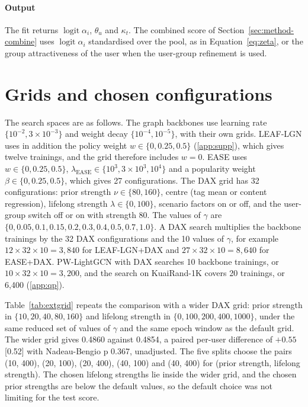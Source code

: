 \documentclass[preprint,12pt,authoryear]{elsarticle}
\begin{document}
\paragraph{Output} The fit returns $\operatorname{logit}\alpha_i$, $\theta_u$ and $\kappa_t$. The combined score of Section~\ref{sec:method-combine} uses
$\operatorname{logit}\alpha_i$ standardised over the pool, as in Equation~\eqref{eq:zeta}, or the group attractiveness of the user when the
user-group refinement is used.

\section{Grids and chosen configurations}\label{app:grids}

The search spaces are as follows. The graph backbones use learning rate $\{10^{-2}, 3\times10^{-3}\}$ and weight decay $\{10^{-4}, 10^{-5}\}$, with
their own grids. LEAF-LGN uses in addition the policy weight $w\in\{0, 0.25, 0.5\}$ (\ref{app:supp}), which gives twelve trainings,
and the grid therefore includes $w=0$. EASE uses $w\in\{0,0.25,0.5\}$, $\lambda_{\mathrm{EASE}}\in\{10^{3},3\times10^{3},10^{4}\}$ and a popularity
weight $\beta\in\{0,0.25,0.5\}$, which gives 27 configurations. The DAX grid has 32 configurations: prior strength $\nu\in\{80,160\}$, centre (tag
mean or content regression), lifelong strength $\lambda\in\{0,100\}$, scenario factors on or off, and the user-group switch off or on with strength
80. The values of $\gamma$ are $\{0, 0.05, 0.1, 0.15, 0.2, 0.3, 0.4, 0.5, 0.7, 1.0\}$. A DAX search multiplies the backbone trainings by the 32 DAX
configurations and the 10 values of $\gamma$, for example $12\times32\times10=3{,}840$ for LEAF-LGN+DAX and $27\times32\times10=8{,}640$ for EASE+DAX.
PW-LightGCN with DAX searches 10 backbone trainings, or $10\times32\times10=3{,}200$, and the search on KuaiRand-1K covers 20 trainings, or 6,400
(\ref{app:qp}).

Table~\ref{tab:extgrid} repeats the comparison with a wider DAX grid: prior strength in $\{10,20,40,80,160\}$ and lifelong strength in
$\{0,100,200,400,1000\}$, under the same reduced set of values of $\gamma$ and the same epoch window as the default grid. The wider grid gives 0.4860
against 0.4854, a paired per-user difference of $+0.55$ [0.52] with Nadeau-Bengio p 0.367, unadjusted. The five splits choose the pairs (10, 400), (20,
100), (20, 400), (40, 100) and (40, 400) for (prior strength, lifelong strength). The chosen lifelong strengths lie inside the wider grid, and the chosen
prior strengths are below the default values, so the default choice was not limiting for the test score.
\end{document}
